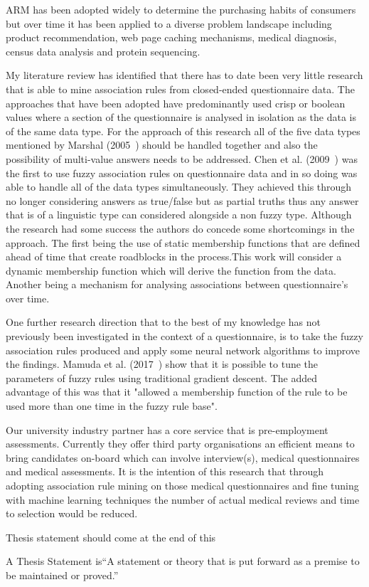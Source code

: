 ARM has been adopted widely to determine the purchasing habits of consumers but over time it has been applied to a diverse problem landscape including product recommendation, web page caching mechanisms, medical diagnosis, census data analysis and protein sequencing.

My literature review has identified that there has to date been very little research that is able to mine association rules from closed-ended questionnaire data. The approaches that have been adopted have predominantly used crisp or boolean values where a section of the questionnaire is analysed in isolation as the data is of the same data type. For the approach of this research all of the five data types mentioned by Marshal (2005~\cite{marshall2005purpose}) should be handled together and also the possibility of multi-value answers needs to be addressed. Chen et al. (2009~\cite{chen2009mining}) was the first to use fuzzy association rules on questionnaire data and in so doing was able to handle all of the data types simultaneously. They achieved this through no longer considering answers as true/false but as partial truths thus any answer that is of a linguistic type can considered alongside a non fuzzy type. Although the research had some success the authors do concede some shortcomings in the approach. The first being the use of static membership functions that are defined ahead of time that create roadblocks in the process.This work will consider a dynamic membership function which will derive the function from the data. Another being a mechanism for analysing associations between questionnaire's over time.

One further research direction that to the best of my knowledge has not previously been investigated in the context of a questionnaire, is to take the fuzzy association rules produced and apply some neural network algorithms to improve the findings. Mamuda et al. (2017~\cite{mamuda2017fusion}) show that it is possible to tune the parameters of fuzzy rules using traditional gradient descent. The added advantage of this was that it "allowed a membership function of the rule to be used more than one time in the fuzzy rule base".


Our university industry partner has a core service that is pre-employment assessments. Currently they offer third party organisations an efficient means to bring candidates on-board which can involve interview(s), medical questionnaires and medical assessments. It is the intention of this research that through adopting association rule mining on those medical questionnaires and fine tuning with machine learning techniques the number of actual medical reviews and time to selection would be reduced.

\par
\noindent
Thesis statement should come at the end of this

A Thesis Statement is“A statement or theory that is put forward as a premise to be maintained or proved.”




